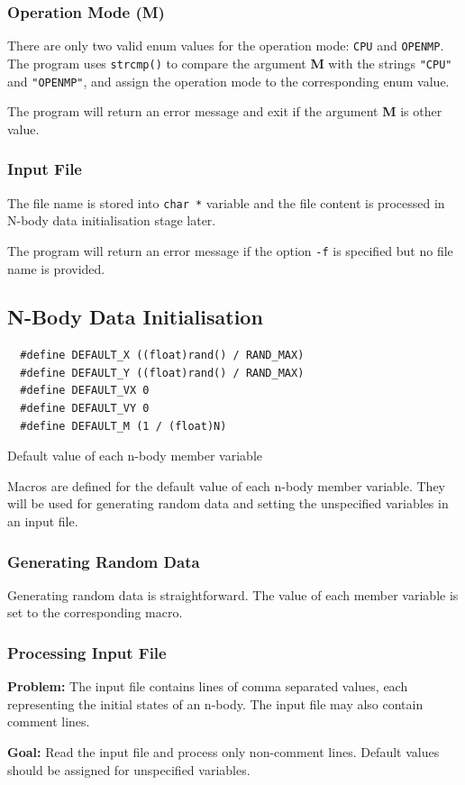 \documentclass[12pt, a4paper]{article}
\begin{document}
\subsubsection{Operation Mode (M)}
There are only two valid enum values for the operation mode: \texttt{CPU} and
\texttt{OPENMP}. The program uses \texttt{strcmp()} to compare the argument
\textbf{M} with the strings \texttt{"CPU"} and \texttt{"OPENMP"}, and assign the
operation mode to the corresponding enum value.

The program will return an error message and exit if the argument \textbf{M} is other value.

\subsubsection{Input File}
The file name is stored into \texttt{char *} variable and the file content is processed in
N-body data initialisation stage later.

The program will return an error message if the option \texttt{-f} is specified but no
file name is provided.

\subsection{N-Body Data Initialisation}
\begin{listing}[ht]
  \begin{verbatim}
  #define DEFAULT_X ((float)rand() / RAND_MAX)
  #define DEFAULT_Y ((float)rand() / RAND_MAX)
  #define DEFAULT_VX 0
  #define DEFAULT_VY 0
  #define DEFAULT_M (1 / (float)N)
  \end{verbatim}
  \caption{Default value of each n-body member variable} \label{listing:default}
\end{listing}

Macros are defined for the default value of each n-body member variable. They will be used for
generating random data and setting the unspecified variables in an input file.

\subsubsection{Generating Random Data}
Generating random data is straightforward. The value of each member variable is set to the
corresponding macro.

\subsubsection{Processing Input File}
\begin{tcolorbox}
\textbf{Problem:} The input file contains lines of comma separated values, each representing the
initial states of an n-body. The input file may also contain comment lines.

\bigskip\textbf{Goal:} Read the input file and process only non-comment lines. Default values should
be assigned for unspecified variables.
\end{tcolorbox}
\end{document}

